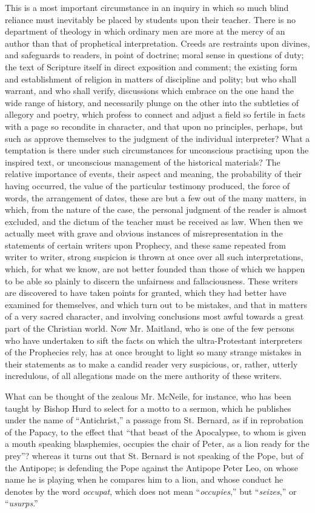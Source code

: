 This is a most important circumstance in an inquiry in which so
much blind reliance must inevitably be placed by students upon their
teacher. There is no department of theology in which ordinary men are
more at the mercy of an author than that of prophetical
interpretation. Creeds are restraints upon divines, and safeguards to
readers, in point of doctrine; moral sense in questions of duty; the
text of Scripture itself in direct exposition and comment; the
existing form and establishment of religion in matters of discipline
and polity; but who shall warrant, and who shall verify, discussions
which embrace on the one hand the wide range of history, and
necessarily plunge on the other into the subtleties of allegory and
poetry, which profess to connect and adjust a field so fertile in
facts with a page so recondite in character, and that upon no
principles, perhaps, but such as approve themselves to the judgment of
the individual interpreter? What a temptation is there under such
circumstances for unconscious practising upon the inspired text, or
unconscious management of the historical materials? The relative
importance of events, their aspect and meaning, the probability of
their having occurred, the value of the particular testimony produced,
the force of words, the arrangement of dates, these are but a few out
of the many matters, in which, from the nature of the case, the
personal judgment of the reader is almost excluded, and the dictum of
the teacher must be received as law. When then we actually meet with
grave and obvious instances of misrepresentation in the statements of
certain writers upon Prophecy, and these same repeated from writer to
writer, strong suspicion is thrown at once over all such
interpretations, which, for what we know, are not better founded than
those of which we happen to be able so plainly to discern the
unfairness and fallaciousness. These writers are discovered to have
taken points for granted, which they had better have examined for
themselves, and which turn out to be mistakes, and that in matters of
a very sacred character, and involving conclusions most awful towards
a great part of the Christian world. Now Mr. Maitland, who is one of
the few persons who have undertaken to sift the facts on which the
ultra-Protestant interpreters of the Prophecies rely, has at once
brought to light so many strange mistakes in their statements as to
make a candid reader very suspicious, or, rather, utterly
incredulous, of all allegations made on the mere authority of these
writers.

What can be thought of the zealous Mr. McNeile, for instance, who
has been taught by Bishop Hurd to select for a motto to a sermon,
which he publishes under the name of ``Antichrist,'' a passage
from St. Bernard, as if in reprobation of the Papacy, to the effect
that ``that beast of the Apocalypse, to whom is given a mouth
speaking blasphemies, occupies the chair of Peter, as a lion ready for
the prey''? whereas it turns out that St. Bernard is not speaking
of the Pope, but of the Antipope; is defending the Pope against the
Antipope Peter Leo, on whose name he is playing when he compares him
to a lion, and whose conduct he denotes by the word \emph{occupat},
which does not mean ``\emph{occupies},'' but ``\emph{seizes},''
or ``\emph{usurps}.''

